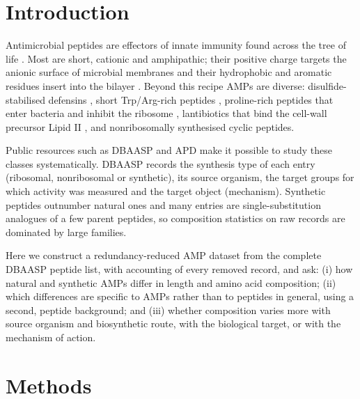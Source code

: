 \documentclass[11pt,a4paper]{article}
\begin{document}
\section{Introduction}
Antimicrobial peptides are effectors of innate immunity found across the tree of life \cite{zasloff2002}. Most are short, cationic and amphipathic; their positive charge targets the anionic
surface of microbial membranes and their hydrophobic and aromatic residues insert into the bilayer \cite{hancock2006}. Beyond this recipe AMPs are diverse: disulfide-stabilised defensins
\cite{ganz2003}, short Trp/Arg-rich peptides \cite{chan2006}, proline-rich peptides that enter bacteria and inhibit the ribosome \cite{graf2017}, lantibiotics that bind the cell-wall precursor
Lipid II \cite{breukink2006}, and nonribosomally synthesised cyclic peptides.

Public resources such as DBAASP \cite{pirtskhalava2021} and APD \cite{wang2016} make it possible to study these classes systematically. DBAASP records the synthesis type of each entry
(ribosomal, nonribosomal or synthetic), its source organism, the target groups for which activity was measured and the target object (mechanism). Synthetic peptides outnumber natural ones and many
entries are single-substitution analogues of a few parent peptides, so composition statistics on raw records are dominated by large families.

Here we construct a redundancy-reduced AMP dataset from the complete DBAASP peptide list, with accounting of every removed record, and ask:
(i) how natural and synthetic AMPs differ in length and amino acid composition; (ii) which differences are specific to AMPs rather than to peptides in general, using a second, peptide background;
and (iii) whether composition varies more with source organism and biosynthetic route, with the biological target, or with the mechanism of action.

\section{Methods}
\end{document}

